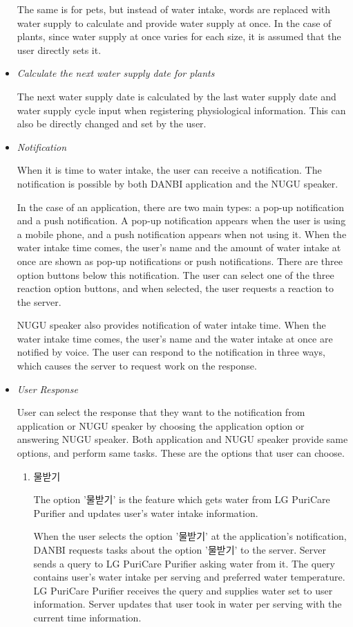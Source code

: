 \documentclass[conference]{IEEEtran}
\begin{document}
\begin{itemize}
The same is for pets, but instead of water intake, words are replaced with water supply to calculate and provide water supply at once.  In the case of plants, since water supply at once varies for each size, it is assumed that the user directly sets it.
\item \textit{Calculate the next water supply date for plants}

The next water supply date is calculated by the last water supply date and water supply cycle input when registering physiological information. This can also be directly changed and set by the user.
\item \textit{Notification}

When it is time to water intake, the user can receive a notification. The notification is possible by both DANBI application and the NUGU speaker.

In the case of an application, there are two main types: a pop-up notification and a push notification. A pop-up notification appears when the user is using a mobile phone, and a push notification appears when not using it. When the water intake time comes, the user's name and the amount of water intake at once are shown as pop-up notifications or push notifications. There are three option buttons below this notification. The user can select one of the three reaction option buttons, and when selected, the user requests a reaction to the server.

NUGU speaker also provides notification of water intake time. When the water intake time comes, the user's name and the water intake at once are notified by voice. The user can respond to the notification in three ways, which causes the server to request work on the response.
\item \textit{User Response}

User can select the response that they want to the notification from application or NUGU speaker by choosing the application option or answering NUGU speaker. Both application and NUGU speaker provide same options, and perform same tasks. These are the options that user can choose.
\begin{enumerate}
\setlength{\parindent}{2ex}
\item 물받기

The option '물받기' is the feature which gets water from LG PuriCare Purifier and updates user's water intake information.

When the user selects the option '물받기' at the application's notification, DANBI requests tasks about the option '물받기' to the server. Server sends a query to LG PuriCare Purifier asking water from it. The query contains user's water intake per serving and preferred water temperature. LG PuriCare Purifier receives the query and supplies water set to user information. Server updates that user took in water per serving with the current time information.


\end{enumerate}
\end{itemize}
\end{document}
